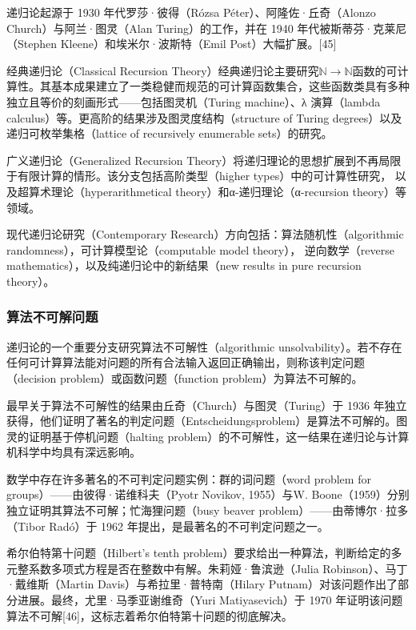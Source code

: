 递归论起源于 1930 年代罗莎·彼得（Rózsa Péter）、阿隆佐·丘奇（Alonzo Church）与阿兰·图灵（Alan Turing）的工作，并在 1940 年代被斯蒂芬·克莱尼（Stephen Kleene）和埃米尔·波斯特（Emil Post）大幅扩展。[45]

经典递归论（Classical Recursion Theory）经典递归论主要研究\(\mathbb{N} \to \mathbb{N}\)函数的可计算性。其基本成果建立了一类稳健而规范的可计算函数集合，这些函数类具有多种独立且等价的刻画形式——包括图灵机（Turing machine）、λ 演算（lambda calculus）等。更高阶的结果涉及图灵度结构（structure of Turing degrees）以及递归可枚举集格（lattice of recursively enumerable sets）的研究。

广义递归论（Generalized Recursion Theory）将递归理论的思想扩展到不再局限于有限计算的情形。该分支包括高阶类型（higher types）中的可计算性研究，
以及超算术理论（hyperarithmetical theory）和α-递归理论（α-recursion theory）等领域。

现代递归论研究（Contemporary Research）方向包括：算法随机性（algorithmic randomness），可计算模型论（computable model theory），
逆向数学（reverse mathematics），以及纯递归论中的新结果（new results in pure recursion theory）。
\subsubsection{算法不可解问题}
递归论的一个重要分支研究算法不可解性（algorithmic unsolvability）。若不存在任何可计算算法能对问题的所有合法输入返回正确输出，则称该判定问题（decision problem）或函数问题（function problem）为算法不可解的。

最早关于算法不可解性的结果由丘奇（Church）与图灵（Turing）于 1936 年独立获得，他们证明了著名的判定问题（Entscheidungsproblem）是算法不可解的。图灵的证明基于停机问题（halting problem）的不可解性，这一结果在递归论与计算机科学中均具有深远影响。

数学中存在许多著名的不可判定问题实例：群的词问题（word problem for groups）——由彼得·诺维科夫（Pyotr Novikov, 1955）与W. Boone（1959）分别独立证明其算法不可解；忙海狸问题（busy beaver problem）——由蒂博尔·拉多（Tibor Radó）于 1962 年提出，是最著名的不可判定问题之一。

希尔伯特第十问题（Hilbert’s tenth problem）要求给出一种算法，判断给定的多元整系数多项式方程是否在整数中有解。朱莉娅·鲁滨逊（Julia Robinson）、马丁·戴维斯（Martin Davis）与希拉里·普特南（Hilary Putnam）对该问题作出了部分进展。最终，尤里·马季亚谢维奇（Yuri Matiyasevich）于 1970 年证明该问题算法不可解[46]，这标志着希尔伯特第十问题的彻底解决。
